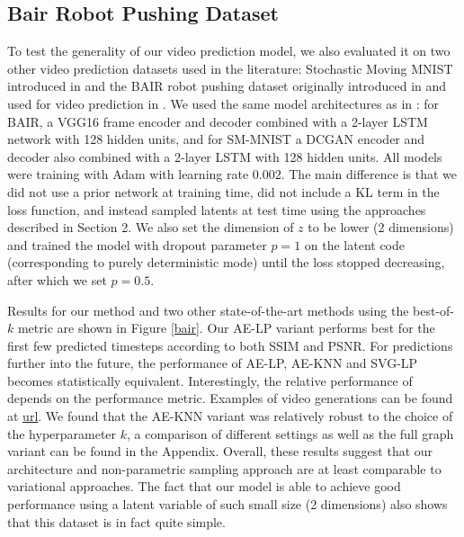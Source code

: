 \documentclass{article}
\begin{document}
\subsection{Bair Robot Pushing Dataset}

To test the generality of our video prediction model, we also evaluated it on two other video prediction datasets used in the literature: Stochastic Moving MNIST introduced in \citep{Denton2018} and the BAIR robot pushing dataset originally introduced in \citep{Ebert17} and used for video prediction in \citep{Babaeizadeh2018, Denton2018}.
We used the same model architectures as in \citep{Denton2018}: for BAIR, a VGG16 frame encoder and decoder combined with a 2-layer LSTM network with 128 hidden units, and for SM-MNIST a DCGAN encoder and decoder also combined with a 2-layer LSTM with 128 hidden units. All models were training with Adam \citep{ADAM} with learning rate $0.002$.
The main difference is that we did not use a prior network at training time, did not include a KL term in the loss function, and instead sampled latents at test time using the approaches described in Section 2.
We also set the dimension of $z$ to be lower (2 dimensions) and trained the model with dropout parameter $p=1$ on the latent code (corresponding to purely deterministic mode) until the loss stopped decreasing, after which we set $p=0.5$.

Results for our method and two other state-of-the-art methods using the best-of-$k$ metric are shown in Figure \ref{bair}. Our AE-LP variant performs best for the first few predicted timesteps according to both SSIM and PSNR. For predictions further into the future, the performance of AE-LP, AE-KNN and SVG-LP becomes statistically equivalent.  Interestingly, the relative performance of \citep{Babaeizadeh2018} depends on the performance metric. Examples of video generations can be found at \url{url}. We found that the AE-KNN variant was relatively robust to the choice of the hyperparameter $k$, a comparison of different settings as well as the full graph variant can be found in the Appendix. Overall, these results suggest that our architecture and non-parametric sampling approach are at least comparable to variational approaches. The fact that our model is able to achieve good performance using a latent variable of such small size (2 dimensions) also shows that this dataset is in fact quite simple.
\end{document}
